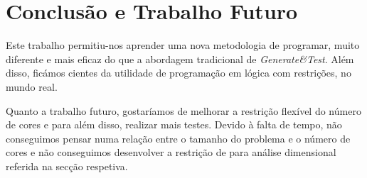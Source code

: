 \section{Conclusão e Trabalho Futuro}
Este trabalho permitiu-nos aprender uma nova metodologia de programar, muito diferente e mais eficaz do que a abordagem tradicional de \textit{Generate\&Test}. Além disso, ficámos cientes da utilidade de programação em lógica com restrições, no mundo real.

Quanto a trabalho futuro, gostaríamos de melhorar a restrição flexível do número de cores e para além disso, realizar mais testes. Devido à falta de tempo, não conseguimos pensar numa relação entre o tamanho do problema e o número de cores e não conseguimos desenvolver a restrição de para análise dimensional referida na secção respetiva.